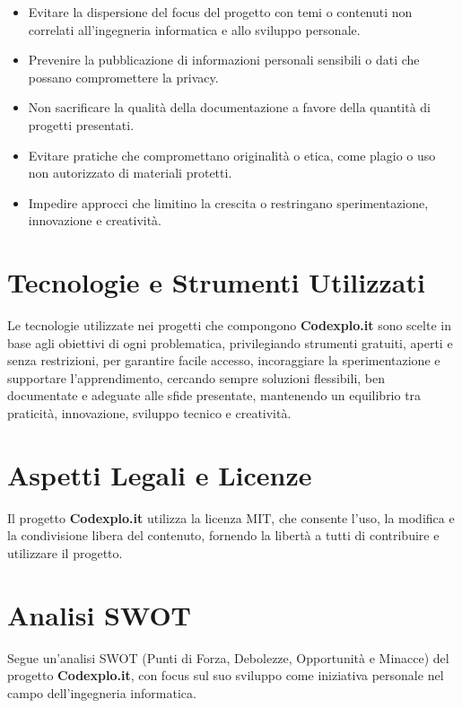 \documentclass[10pt, a4paper, oneside]{article}
\begin{document}
\begin{itemize}
    \item Evitare la dispersione del focus del progetto con temi o contenuti non correlati all’ingegneria informatica e allo sviluppo personale.
    \item Prevenire la pubblicazione di informazioni personali sensibili o dati che possano compromettere la privacy.
    \item Non sacrificare la qualità della documentazione a favore della quantità di progetti presentati.
    \item Evitare pratiche che compromettano originalità o etica, come plagio o uso non autorizzato di materiali protetti.
    \item Impedire approcci che limitino la crescita o restringano sperimentazione, innovazione e creatività.
\end{itemize}

\section{Tecnologie e Strumenti Utilizzati}

Le tecnologie utilizzate nei progetti che compongono \textbf{Codexplo.it} sono scelte in base agli obiettivi di ogni problematica, privilegiando strumenti gratuiti, aperti e senza restrizioni, per garantire facile accesso, incoraggiare la sperimentazione e supportare l’apprendimento, cercando sempre soluzioni flessibili, ben documentate e adeguate alle sfide presentate, mantenendo un equilibrio tra praticità, innovazione, sviluppo tecnico e creatività.

\section{Aspetti Legali e Licenze}

Il progetto \textbf{Codexplo.it} utilizza la licenza MIT, che consente l’uso, la modifica e la condivisione libera del contenuto, fornendo la libertà a tutti di contribuire e utilizzare il progetto.

\section{Analisi SWOT}

Segue un’analisi SWOT (Punti di Forza, Debolezze, Opportunità e Minacce) del progetto \textbf{Codexplo.it}, con focus sul suo sviluppo come iniziativa personale nel campo dell’ingegneria informatica.
\end{document}
